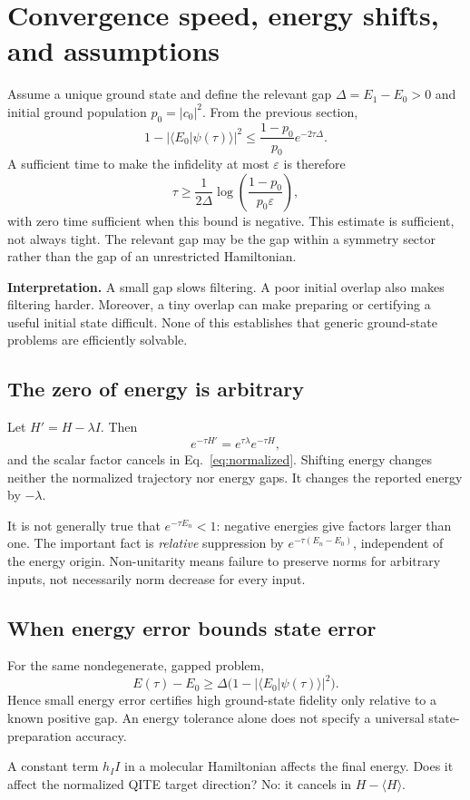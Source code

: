 \documentclass[11pt,a4paper]{article}
\newcommand{\braket}[2]{\langle #1\vert #2\rangle}
\newcommand{\ex}[1]{\langle #1\rangle}
\newcommand{\lesson}[2]{\clearpage\section{#1}\label{#2}}
\newcommand{\checkpoint}[1]{\begin{idea}[Pause and check]#1\end{idea}}
\begin{document}
\lesson{Convergence speed, energy shifts, and assumptions}{sec:gap}
Assume a unique ground state and define the relevant gap $\Delta=E_1-E_0>0$ and initial ground population $p_0=|c_0|^2$. From the previous section,
\[
1-|\braket{E_0}{\psi(\tau)}|^2
\le \frac{1-p_0}{p_0}e^{-2\tau\Delta}.
\]
A sufficient time to make the infidelity at most $\varepsilon$ is therefore
\[
\tau\ge\frac{1}{2\Delta}
\log\!\left(\frac{1-p_0}{p_0\varepsilon}\right),
\]
with zero time sufficient when this bound is negative. This estimate is sufficient, not always tight. The relevant gap may be the gap within a symmetry sector rather than the gap of an unrestricted Hamiltonian.

\textbf{Interpretation.} A small gap slows filtering. A poor initial overlap also makes filtering harder. Moreover, a tiny overlap can make preparing or certifying a useful initial state difficult. None of this establishes that generic ground-state problems are efficiently solvable.

\subsection*{The zero of energy is arbitrary}
Let $H'=H-\lambda I$. Then
\[
e^{-\tau H'}=e^{\tau\lambda}e^{-\tau H},
\]
and the scalar factor cancels in Eq.~\eqref{eq:normalized}. Shifting energy changes neither the normalized trajectory nor energy gaps. It changes the reported energy by $-\lambda$.

\begin{caution}
It is not generally true that $e^{-\tau E_n}<1$: negative energies give factors larger than one. The important fact is \emph{relative} suppression by $e^{-\tau(E_n-E_0)}$, independent of the energy origin. Non-unitarity means failure to preserve norms for arbitrary inputs, not necessarily norm decrease for every input.
\end{caution}

\subsection*{When energy error bounds state error}
For the same nondegenerate, gapped problem,
\[
E(\tau)-E_0\ge\Delta\bigl(1-|\braket{E_0}{\psi(\tau)}|^2\bigr).
\]
Hence small energy error certifies high ground-state fidelity only relative to a known positive gap. An energy tolerance alone does not specify a universal state-preparation accuracy.

\checkpoint{A constant term $h_I I$ in a molecular Hamiltonian affects the final energy. Does it affect the normalized QITE target direction? No: it cancels in $H-\ex{H}$.}
\end{document}
